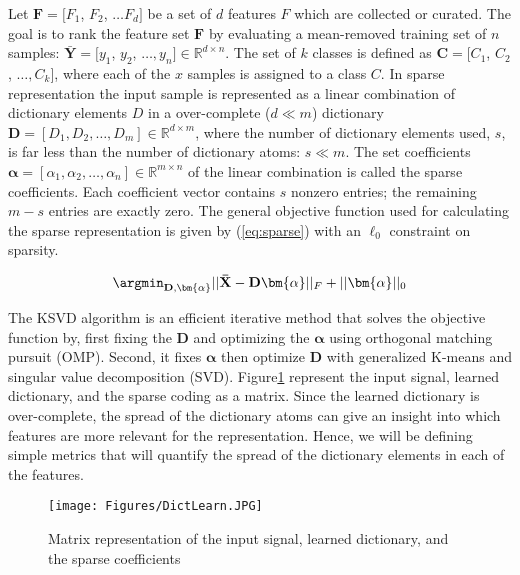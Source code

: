 Let $\mathbf{F} = [F_1$, $F_2$, $\dots F_d]$ be a set of $d$ features $F$ which are collected or curated. The goal is to rank the feature set $\mathbf{F}$ by evaluating a mean-removed training set of $n$ samples: $\mathbf{\bar{Y}} = [y_1$, $y_2$, $\dots, y_n] \in \mathbb{R}^{d \times n}$. The set of $k$ classes is defined as $\mathbf{C} = [C_1$, $C_2$, $\dots, C_k]$, where each of the $x$ samples is assigned to a class $C$. In sparse representation the input sample is represented as a linear combination of dictionary elements $D$ in a over-complete ($d \ll m$) dictionary $\mathbf{D} = [D_1, D_2, \dots, D_m] \in \mathbb{R}^{d \times m}$, where the number of dictionary elements used, $s$, is far less than the number of dictionary atoms: $s \ll m$. The set coefficients $\bm{\alpha} = [\alpha_1, \alpha_2, \dots, \alpha_n] \in \mathbb{R}^{m \times n}$ of the linear combination is called the sparse coefficients. Each coefficient vector contains $s$ nonzero entries; the remaining $m-s$ entries are exactly zero. The general objective function used for calculating the sparse representation is given by (\ref{eq:sparse}) with an $\ell_0$ constraint on sparsity.

\begin{equation}
    \label{eq:sparse}
    \argmin_{\mathbf{D},\bm{\alpha}} ||\mathbf{\bar{X}}- \mathbf{D}\bm{\alpha}||_F + ||\bm{\alpha}||_0
\end{equation}

The KSVD algorithm is an efficient iterative method that solves the objective function by, first fixing the $\mathbf{D}$ and optimizing the $\bm{\alpha}$ using orthogonal matching pursuit (OMP)\cite{Pati1993}. Second, it fixes $\bm{\alpha}$ then optimize $\mathbf{D}$ with generalized K-means and singular value decomposition (SVD). Figure\ref{fig: DictLearn} represent the input signal, learned dictionary, and the sparse coding as a matrix. Since the learned dictionary is over-complete, the spread of the dictionary atoms can give an insight into which features are more relevant for the representation. Hence, we will be defining simple metrics that will quantify the spread of the dictionary elements in each of the features. 

\begin{figure}
    \centering
    \texttt{[image: Figures/DictLearn.JPG]}
    \caption{Matrix representation of the input signal, learned dictionary, and the sparse coefficients}\label{fig: DictLearn}
\end{figure}

